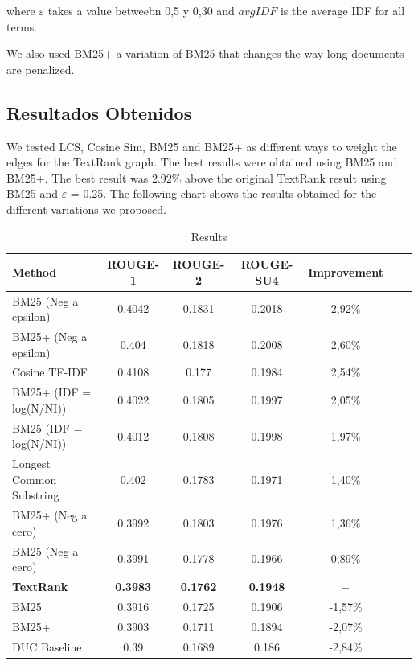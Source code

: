\documentclass{llncs}
\begin{document}
where $\varepsilon$ takes a value betweebn 0,5 y 0,30 and $avgIDF$ is the average IDF for all terms.

We also used BM25+ a variation of BM25 that changes the way long documents are penalized.

\subsection{Resultados Obtenidos}
We tested LCS, Cosine Sim, BM25 and BM25+ as different ways to weight the edges for the TextRank graph. 
The best results were obtained using BM25 and BM25+. The best result was 2.92\% above the original TextRank result using BM25 and $\varepsilon$ = 0.25. The following chart shows the results obtained for the different variations we proposed.

\begin{table}
\caption{Results}
\begin{center}
\begin{tabular}{l*{5}{c}r}
\hline
\rule{0pt}{12pt}
Method & ROUGE-1 & ROUGE-2 & ROUGE-SU4 & Improvement \\[2pt]
\hline\rule{0pt}{12pt}\mbox{}\par\nobreak
BM25 (Neg a epsilon) & 0.4042 & 0.1831 & 0.2018 & 2,92\% \\
BM25+ (Neg a epsilon) & 0.404 & 0.1818 & 0.2008 & 2,60\% \\
Cosine TF-IDF & 0.4108 & 0.177 & 0.1984 & 2,54\% \\
BM25+ (IDF = log(N/NI)) & 0.4022 & 0.1805 & 0.1997 & 2,05\% \\ 
BM25 (IDF = log(N/NI)) & 0.4012 & 0.1808 & 0.1998 & 1,97\% \\ 
Longest Common Substring & 0.402 & 0.1783 & 0.1971 & 1,40\% \\
BM25+ (Neg a cero) & 0.3992 & 0.1803 & 0.1976 & 1,36\% \\ 
BM25 (Neg a cero) & 0.3991 & 0.1778 & 0.1966 & 0,89\% \\
\textbf{TextRank} & \textbf{0.3983} & \textbf{0.1762} & \textbf{0.1948} & \textbf{--}\\
BM25 & 0.3916 & 0.1725 & 0.1906 & -1,57\% \\
BM25+ & 0.3903 & 0.1711 & 0.1894 & -2,07\% \\
DUC Baseline & 0.39 & 0.1689 & 0.186 & -2,84\% \\ [2pt]
\hline
\end{tabular}
\end{center}
\end{table}
\end{document}
